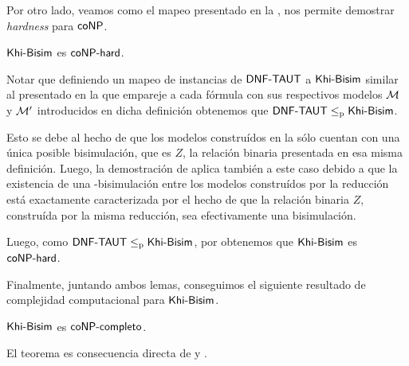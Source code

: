Por otro lado, veamos como el mapeo presentado en la , nos permite demostrar \textit{hardness} para $\rm\textsf{coNP}$.

\begin{lema}\label{lema:khi-bisim-conphard}
    $\rm\textsf{Khi-Bisim}$ es $\rm\textsf{coNP-hard}$.
\end{lema}

\begin{demostracion}
    Notar que definiendo un mapeo de instancias de $\rm\textsf{DNF-TAUT}$ a $\rm\textsf{Khi-Bisim}$ similar al presentado en la  que 
    empareje a cada fórmula con sus respectivos modelos $\mathcal{M}$ y $\mathcal{M}'$ introducidos en dicha definición obtenemos que 
    $\rm\textsf{DNF-TAUT} \leq_p \rm\textsf{Khi-Bisim}$. 

    Esto se debe al hecho de que los modelos construídos en la  sólo cuentan con una única posible bisimulación, 
    que es $Z$, la relación binaria presentada en esa misma definición. Luego, la demostración de  aplica también 
    a este caso debido a que la existencia de una \KHilogic-bisimulación entre los modelos construídos por la reducción está exactamente 
    caracterizada por el hecho de que la relación binaria $Z$, construída por la misma reducción, sea efectivamente una bisimulación.

    Luego, como $\rm\textsf{DNF-TAUT} \leq_p \rm\textsf{Khi-Bisim}$, por  obtenemos que $\rm\textsf{Khi-Bisim}$ es $\rm\textsf{coNP-hard}$.
\end{demostracion}

Finalmente, juntando ambos lemas, conseguimos el siguiente resultado de complejidad computacional para $\rm\textsf{Khi-Bisim}$.

\begin{teorema}\label{thm:khibisim-conpcomplete}
    $\rm\textsf{Khi-Bisim}$ es $\rm\textsf{coNP-completo}$.
\end{teorema}

\begin{demostracion}
    El teorema es consecuencia directa de  y .
\end{demostracion}






